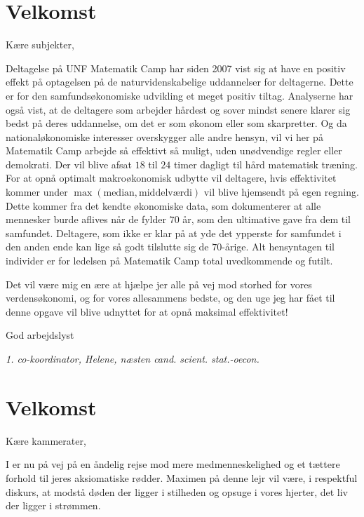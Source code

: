 

\begin{minipage}[b]{0.95\linewidth}
\begin{minipage}[t]{0.47\textwidth}
\vspace{3mm}

\section*{Velkomst}
Kære subjekter,

Deltagelse på UNF Matematik Camp har siden 2007 vist sig at have en positiv effekt på optagelsen på de naturvidenskabelige uddannelser for deltagerne. Dette er for den samfundsøkonomiske udvikling et meget positiv tiltag. Analyserne har også vist, at de deltagere som arbejder hårdest og sover mindst senere klarer sig bedst på deres uddannelse, om det er som økonom eller som skarpretter. Og da nationaløkonomiske interesser overskygger alle andre hensyn, vil vi her på Matematik Camp arbejde så effektivt så muligt, uden unødvendige regler eller demokrati. Der vil blive afsat $18$ til $24$ timer dagligt til hård matematisk træning. For at opnå optimalt makroøkonomisk udbytte vil deltagere, hvis effektivitet kommer under $\max(\text{median},\text{middelværdi})$ vil blive hjemsendt på egen regning. Dette kommer fra det kendte økonomiske data, som dokumenterer at alle mennesker burde aflives når de fylder $70$ år, som den ultimative gave fra dem til samfundet. Deltagere, som ikke er klar på at yde det ypperste for samfundet i den anden ende kan lige så godt tilslutte sig de $70$-årige. Alt hensyntagen til individer er for ledelsen på Matematik Camp total uvedkommende og futilt. 

Det vil være mig en ære at hjælpe jer alle på vej mod storhed for vores verdensøkonomi, og for vores allesammens bedste, og den uge jeg har fået til denne opgave vil blive udnyttet for at opnå maksimal effektivitet!

God arbejdslyst 

{\flushright\emph{1. co-koordinator, Helene, næsten cand. scient. stat.-oecon.}}

\section*{Velkomst}
Kære kammerater,

I er nu på vej på en åndelig rejse mod mere medmenneskelighed og et tættere forhold til jeres aksiomatiske rødder. Maximen på denne lejr vil være, i respektful diskurs, at modstå døden der ligger i stilheden og opsuge i vores hjerter, det liv der ligger i strømmen. 


\end{minipage}
\end{minipage}

